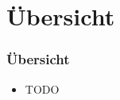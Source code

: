 \section{Übersicht}
\label{sec:uebersicht}

\begin{frame}
  \frametitle{Übersicht}

  \begin{itemize}
  \item TODO
  \end{itemize}
\end{frame}
